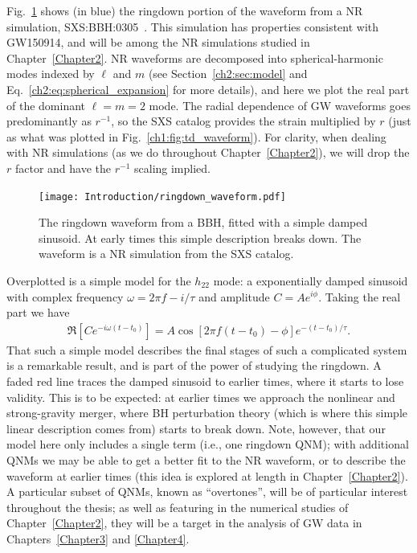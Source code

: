 Fig.~\ref{ch1:fig:rd_waveform} shows (in blue) the ringdown portion of the waveform from a NR simulation, SXS:BBH:0305~\cite{Lovelace:2016uwp}.
This simulation has properties consistent with GW150914, and will be among the NR simulations studied in Chapter~\ref{Chapter2}.
NR waveforms are decomposed into spherical-harmonic modes indexed by $\ell$ and $m$ (see Section~\ref{ch2:sec:model} and Eq.~\ref{ch2:eq:spherical_expansion} for more details), and here we plot the real part of the dominant $\ell = m = 2$ mode.
The radial dependence of GW waveforms goes predominantly as $r^{-1}$, so the SXS catalog provides the strain multiplied by $r$ (just as what was plotted in Fig.~\ref{ch1:fig:td_waveform}).
For clarity, when dealing with NR simulations (as we do throughout Chapter~\ref{Chapter2}), we will drop the $r$ factor and have the $r^{-1}$ scaling implied.

\begin{figure}[t!]
    \centering
    \texttt{[image: Introduction/ringdown\_waveform.pdf]}
    \caption[Gravitational-wave ringdown waveform]{ 
    The ringdown waveform from a BBH, fitted with a simple damped sinusoid. 
    At early times this simple description breaks down. 
    The waveform is a NR simulation from the SXS catalog.
    }
    \label{ch1:fig:rd_waveform}
\end{figure}

Overplotted is a simple model for the $h_{22}$ mode: a exponentially damped sinusoid with complex frequency $\omega = 2\pi f - i/\tau$ and amplitude $C = Ae^{i\phi}$. 
Taking the real part we have
\begin{align}
    \Re[Ce^{-i\omega(t-t_0)}] = A\cos[2\pi f(t-t_0) - \phi]e^{-(t-t_0)/\tau}.
\end{align}
That such a simple model describes the final stages of such a complicated system is a remarkable result, and is part of the power of studying the ringdown.
A faded red line traces the damped sinusoid to earlier times, where it starts to lose validity.
This is to be expected: at earlier times we approach the nonlinear and strong-gravity merger, where BH perturbation theory (which is where this simple linear description comes from) starts to break down.
Note, however, that our model here only includes a single term (i.e., one ringdown QNM); with additional QNMs we may be able to get a better fit to the NR waveform, or to describe the waveform at earlier times (this idea is explored at length in Chapter~\ref{Chapter2}).
A particular subset of QNMs, known as ``overtones'', will be of particular interest throughout the thesis; as well as featuring in the numerical studies of Chapter~\ref{Chapter2}, they will be a target in the analysis of GW data in Chapters~\ref{Chapter3} and \ref{Chapter4}.

